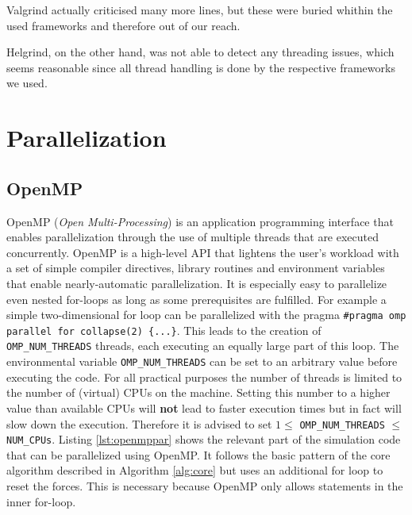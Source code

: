 \documentclass[a4paper,11pt]{scrartcl} %
\begin{document}



Valgrind actually criticised many more lines, but these were buried whithin the used frameworks and therefore out of our reach.

Helgrind, on the other hand, was not able to detect any threading issues, which seems reasonable since all thread handling is done by the respective frameworks we used.

\section{Parallelization}
\subsection{OpenMP}
OpenMP (\textit{Open Multi-Processing}) is an application programming interface that enables parallelization through the use of multiple threads that are executed concurrently. OpenMP is a high-level API that lightens the user's workload with a set of simple compiler directives, library routines and environment variables that enable nearly-automatic parallelization. It is especially easy to parallelize even nested for-loops as long as some prerequisites are fulfilled. For example a simple two-dimensional for loop can be parallelized with the pragma \texttt{\#pragma omp parallel for collapse(2) \{...\}}. This leads to the creation of \texttt{OMP\_NUM\_THREADS} threads, each executing an equally large part of this loop. The environmental variable \texttt{OMP\_NUM\_THREADS} can be set to an arbitrary value before executing the code. For all practical purposes the number of threads is limited to the number of (virtual) CPUs on the machine. Setting this number to a higher value than available CPUs will \textbf{not} lead to faster execution times but in fact will slow down the execution. Therefore it is advised to set $1 \leq $ \texttt{OMP\_NUM\_THREADS} $\leq $ \texttt{NUM\_CPUs}. Listing \ref{lst:openmppar} shows the relevant part of the simulation code that can be parallelized using OpenMP. It follows the basic pattern of the core algorithm described in Algorithm \ref{alg:core} but uses an additional for loop to reset the forces. This is necessary because OpenMP only allows statements in the inner for-loop.\\
\end{document}
